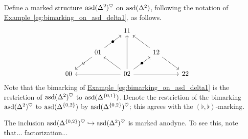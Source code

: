 \documentclass[main.tex]{subfiles}
\begin{document}
\begin{example}
  \label{eg:bimarking_on_asd_delta2}
  Define a marked structure $\mathrm{asd}(\Delta^{2})^{\heartsuit}$ on $\mathrm{asd}(\Delta^{2})$, following the notation of \hyperref[eg:bimarking_on_asd_delta1]{Example~\ref*{eg:bimarking_on_asd_delta1}}, as follows.
  \begin{equation*}
    \begin{tikzcd}
      && 11
      \\
      & 01
      \arrow[ur, "\bullet" marking]
      \arrow[dl, "\circ" marking]
      && 12
      \arrow[ul]
      \arrow[dr]
      \\
      00
      && 02
      \arrow[ll]
      \arrow[rr]
      \arrow[uu]
      \arrow[ur, "\bullet" marking]
      \arrow[ul]
      && 22
    \end{tikzcd}
  \end{equation*}
  Note that the bimarking of \hyperref[eg:bimarking_on_asd_delta1]{Example~\ref*{eg:bimarking_on_asd_delta1}} is the restriction of $\mathrm{asd}(\Delta^{2})^{\heartsuit}$ to $\mathrm{asd}(\Delta^{\{0, 1\}})$. Denote the restriction of the bimarking $\mathrm{asd}(\Delta^{2})^{\heartsuit}$ to $\mathrm{asd}(\Delta^{\{0, 2\}})$ by $\mathrm{asd}(\Delta^{\{0, 2\}})^{\heartsuit}$; this agrees with the $(\flat,\flat)$-marking.

  The inclusion $\mathrm{asd}(\Delta^{\{0, 2\}})^{\heartsuit} \hookrightarrow \mathrm{asd}(\Delta^{2})^{\heartsuit}$ is marked anodyne. To see this, note that... factorization...
\end{example}
\end{document}
